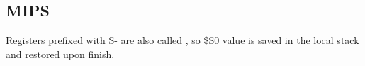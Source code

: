 \subsection{MIPS}



Registers prefixed with S- are also called , 
so \$S0 value is saved in the local stack
and restored upon finish.
